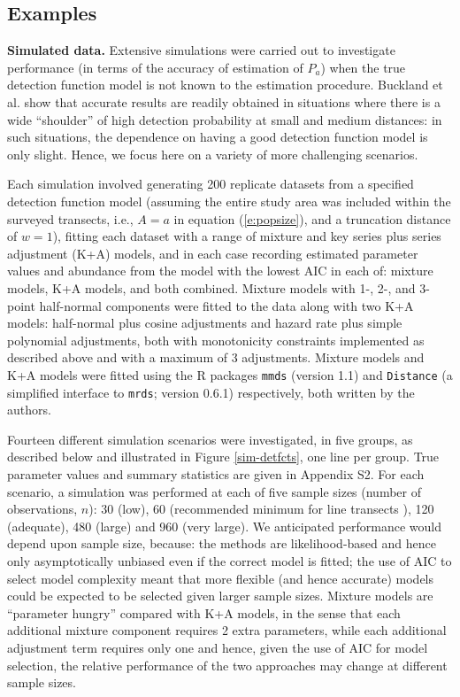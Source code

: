 \documentclass[10pt]{article}
\begin{document}
\subsection*{Examples}

\textbf{Simulated data.} Extensive simulations were carried out to investigate performance (in terms of the accuracy of estimation of $P_a$) when the true detection function model is not known to the estimation procedure. 
 Buckland et al. \cite{Buckland:2001vm} show that accurate results are readily obtained in situations where there is a wide ``shoulder'' of high detection probability at small and medium distances: in such situations, the dependence on having a good detection function model is only slight.  Hence, we focus here on a variety of more challenging scenarios.

Each simulation involved generating 200 replicate datasets from a specified detection function model (assuming the entire study area was included within the surveyed transects, i.e., $A=a$ in equation (\ref{e:popsize}), and a truncation distance of $w=1$), fitting each dataset with a range of mixture and key series plus series adjustment (K+A) models, and in each case recording estimated parameter values and abundance from the model with the lowest AIC in each of: mixture models, K+A models, and both combined.  Mixture models with 1-, 2-, and 3-point half-normal components were fitted to the data along with two K+A models: half-normal plus cosine adjustments and hazard rate plus simple polynomial adjustments, both with monotonicity constraints implemented as described above and with a maximum of 3 adjustments. Mixture models and K+A models were fitted using the R packages \texttt{mmds} (version 1.1) and \texttt{Distance} \cite{Distance} (a simplified interface to \texttt{mrds}; version 0.6.1) respectively, both written by the authors.

Fourteen different simulation scenarios were investigated, in five groups, as described below and illustrated in Figure \ref{sim-detfcts}, one line per group. True parameter values and summary statistics are given in Appendix S2.  For each scenario, a simulation was performed at each of five sample sizes (number of observations, $n$): 30 (low), 60 (recommended minimum for line transects \cite{Buckland:2001vm}), 120 (adequate), 480 (large) and 960 (very large).  We anticipated performance would depend upon sample size, because: the methods are likelihood-based and hence only asymptotically unbiased even if the correct model is fitted; the use of AIC to select model complexity meant that more flexible (and hence accurate) models could be expected to be selected given larger sample sizes. Mixture models are ``parameter hungry'' compared with K+A models, in the sense that each additional mixture component requires 2 extra parameters, while each additional adjustment term requires only one and hence, given the use of AIC for model selection, the relative performance of the two approaches may change at different sample sizes. 
\end{document}
